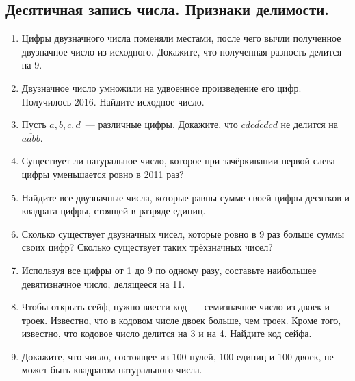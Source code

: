 \documentclass[11pt]{article}
\begin{document}
    \subsection*{Десятичная запись числа. Признаки делимости.}
    \begin{enumerate}[start=16,label={\bfseries \arabic*.}]
        \item Цифры двузначного числа поменяли местами, после чего вычли полученное двузначное число из исходного. Докажите, что полученная разность делится на 9.

        \item Двузначное число умножили на удвоенное произведение его цифр. Получилось 2016. Найдите исходное число.

        \item Пусть $a, b, c, d$~--- различные цифры. Докажите, что $\overline{cdcdcdcd}$ не делится на $\overline{aabb}$.

        \item Существует ли натуральное число, которое при зачёркивании первой слева цифры уменьшается ровно в 2011 раз?

        \item Найдите все двузначные числа, которые равны сумме своей цифры десятков и квадрата цифры, стоящей в разряде единиц.

        \item Сколько существует двузначных чисел, которые ровно в 9 раз больше суммы своих цифр? Сколько существует таких трёхзначных чисел?

        \item Используя все цифры от 1 до 9 по одному разу, составьте наибольшее девятизначное число, делящееся на 11.

        \item Чтобы открыть сейф, нужно ввести код~--- семизначное число из двоек и троек. Известно, что в кодовом числе двоек больше, чем троек. Кроме того, известно, что кодовое число делится на 3 и на 4. Найдите код сейфа.

        \item Докажите, что число, состоящее из 100 нулей, 100 единиц и 100 двоек, не может быть квадратом натурального числа.
    \end{enumerate}
\end{document}
